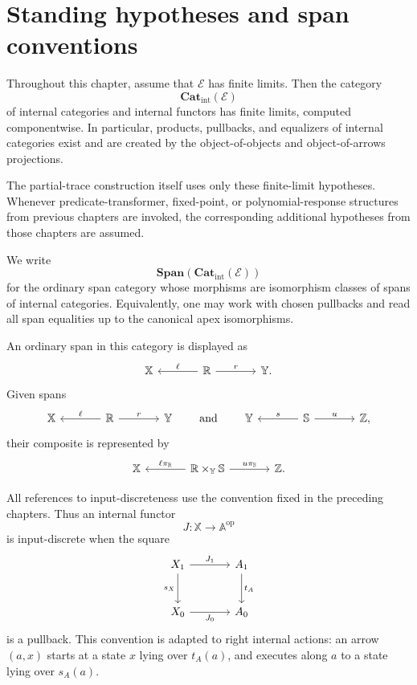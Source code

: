 \section{Standing hypotheses and span conventions}
\label{sec:partial-trace-standing-hypotheses}

Throughout this chapter, assume that \(\mathcal E\) has finite limits.  Then
the category
\[
\mathbf{Cat}_{\mathrm{int}}(\mathcal E)
\]
of internal categories and internal functors has finite limits, computed
componentwise.  In particular, products, pullbacks, and equalizers of internal
categories exist and are created by the object-of-objects and object-of-arrows
projections.

The partial-trace construction itself uses only these finite-limit hypotheses.
Whenever predicate-transformer, fixed-point, or polynomial-response structures
from previous chapters are invoked, the corresponding additional hypotheses
from those chapters are assumed.

We write
\[
\mathbf{Span}(\mathbf{Cat}_{\mathrm{int}}(\mathcal E))
\]
for the ordinary span category whose morphisms are isomorphism classes of spans
of internal categories.  Equivalently, one may work with chosen pullbacks and
read all span equalities up to the canonical apex isomorphisms.

An ordinary span in this category is displayed as
\[
\begin{tikzcd}[column sep=large]
\mathbb X
&
\mathbb R
  \arrow[l, "\ell"']
  \arrow[r, "r"]
&
\mathbb Y .
\end{tikzcd}
\]
Given spans
\[
\begin{tikzcd}[column sep=large]
\mathbb X
&
\mathbb R
  \arrow[l, "\ell"']
  \arrow[r, "r"]
&
\mathbb Y
\end{tikzcd}
\qquad
\text{and}
\qquad
\begin{tikzcd}[column sep=large]
\mathbb Y
&
\mathbb S
  \arrow[l, "s"']
  \arrow[r, "u"]
&
\mathbb Z,
\end{tikzcd}
\]
their composite is represented by
\[
\begin{tikzcd}[column sep=large]
\mathbb X
&
\mathbb R\times_{\mathbb Y}\mathbb S
  \arrow[l, "\ell\pi_{\mathbb R}"']
  \arrow[r, "u\pi_{\mathbb S}"]
&
\mathbb Z .
\end{tikzcd}
\]

All references to input-discreteness use the convention fixed in the preceding
chapters.  Thus an internal functor
\[
J:\mathbb X\to\mathbb A^{\mathrm{op}}
\]
is input-discrete when the square
\[
\begin{tikzcd}[column sep=large,row sep=large]
X_1
  \arrow[r,"J_1"]
  \arrow[d,"s_X"']
&
A_1
  \arrow[d,"t_A"]
\\
X_0
  \arrow[r,"J_0"']
&
A_0
\end{tikzcd}
\]
is a pullback.  This convention is adapted to right internal actions: an arrow
\((a,x)\) starts at a state \(x\) lying over \(t_A(a)\), and executes along
\(a\) to a state lying over \(s_A(a)\).

